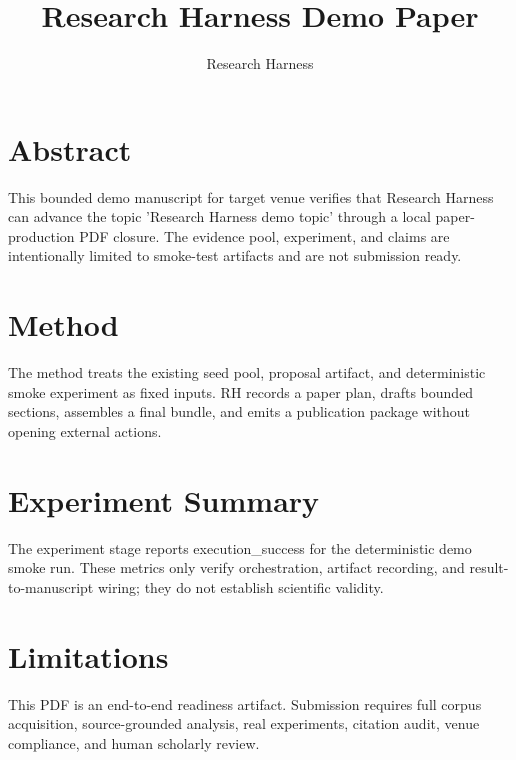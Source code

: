 \documentclass{article}
\begin{document}
\title{Research Harness Demo Paper}
\author{Research Harness}
\maketitle
\section{Abstract}
This bounded demo manuscript for target venue verifies that Research Harness can advance the topic 'Research Harness demo topic' through a local paper-production PDF closure. The evidence pool, experiment, and claims are intentionally limited to smoke-test artifacts and are not submission ready.

\section{Method}
The method treats the existing seed pool, proposal artifact, and deterministic smoke experiment as fixed inputs. RH records a paper plan, drafts bounded sections, assembles a final bundle, and emits a publication package without opening external actions.

\section{Experiment Summary}
The experiment stage reports execution\_success for the deterministic demo smoke run. These metrics only verify orchestration, artifact recording, and result-to-manuscript wiring; they do not establish scientific validity.

\section{Limitations}
This PDF is an end-to-end readiness artifact. Submission requires full corpus acquisition, source-grounded analysis, real experiments, citation audit, venue compliance, and human scholarly review.
\end{document}
